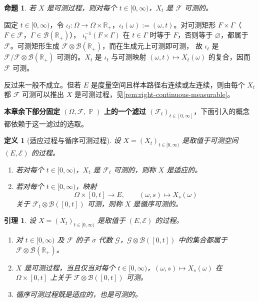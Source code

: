 \documentclass[UTF8,11pt,a4paper,oneside,fontset=fandol]{ctexrep}
\makeatletter
\numberwithin{equation}{section}
\theoremstyle{zhthm}
\newtheorem{proposition}[theorem]{命题}
\newtheorem{lemma}[theorem]{引理}
\newtheorem{definition}[theorem]{定义}
\renewenvironment{proof}[1][\proofname]{\par
  \pushQED{\qed}%
  \normalfont\topsep6\p@\@plus6\p@\relax
  \trivlist
  \item[\hskip\labelsep\bfseries#1\hspace{0.5em}]\ignorespaces
}{%
  \popQED\endtrivlist\@endpefalse
}
\renewcommand{\proofname}{证明}
\newcommand{\R}{\mathbb{R}}
\newcommand{\B}{\mathcal{B}}
\newcommand{\F}{\mathcal{F}}
\newcommand{\G}{\mathcal{G}}
\DeclareMathOperator{\Prob}{\mathbb{P}}
\makeatother
\begin{document}
\begin{proposition}
\label{prop:measurable-process-marginals}
若 $X$ 是可测过程，则对每个 $t\in[0,\infty)$，$X_t$ 是 $\F$ 可测的。
\end{proposition}

\begin{proof}
固定 $t\in[0,\infty)$，令 $\iota_t:\Omega\to\Omega\times\R_+$，$\iota_t(\omega):=(\omega,t)$。对可测矩形 $F\times\Gamma$（$F\in\F$，$\Gamma\in\B(\R_+)$），
$\iota_t^{-1}(F\times\Gamma)$ 在 $t\in\Gamma$ 时等于 $F$，否则等于 $\varnothing$，都属于 $\F$。可测矩形生成 $\F\otimes\B(\R_+)$，而在生成元上可测即可测\cite[定理 1.3.1]{Durrett2019}，
故 $\iota_t$ 是 $\F/\F\otimes\B(\R_+)$ 可测的。$X_t$ 是 $\iota_t$ 与可测映射 $(\omega,t)\mapsto X_t(\omega)$ 的复合，因而 $\F$ 可测。
\end{proof}

反过来一般不成立。但若 $E$ 是度量空间且样本路径右连续或左连续，则由每个 $X_t$ 都 $\F$ 可测可以推出 $X$ 是可测过程，见\cref{rem:right-continuous-measurable}。

\textbf{本章余下部分固定 $(\Omega,\F,\Prob)$ 上的一个滤过 $(\F_t)_{t\in[0,\infty]}$}，下面引入的概念都依赖于这一滤过的选取。

\begin{definition}[适应过程与循序可测过程]
\label{def:adapted-progressive}
设 $X=(X_t)_{t\in[0,\infty)}$ 是取值于可测空间 $(E,\mathcal E)$ 的过程。
\begin{enumerate}[label=(\arabic*)]
  \item 若对每个 $t\in[0,\infty)$，$X_t$ 是 $\F_t$ 可测的，则称 $X$ 是适应的。
  \item 若对每个 $t\in[0,\infty)$，映射
    \[
      \Omega\times[0,t]\to E,\qquad (\omega,s)\mapsto X_s(\omega)
    \]
    关于 $\F_t\otimes\B([0,t])$ 可测，则称 $X$ 是循序可测的。
\end{enumerate}
\end{definition}

\begin{lemma}
\label{lem:measurable-progressive-basic}
设 $X=(X_t)_{t\in[0,\infty)}$ 是取值于 $(E,\mathcal E)$ 的过程。
\begin{enumerate}[label=(\arabic*)]
  \item 对 $t\in[0,\infty)$ 及 $\F$ 的子 $\sigma$ 代数 $\G$，$\G\otimes\B([0,t])$ 中的集合都属于 $\F\otimes\B(\R_+)$。
  \item $X$ 是可测过程，当且仅当对每个 $t\in[0,\infty)$，$(\omega,s)\mapsto X_s(\omega)$ 在 $\Omega\times[0,t]$ 上关于 $\F\otimes\B([0,t])$ 可测。
  \item 循序可测过程既是适应的，也是可测的。
\end{enumerate}
\end{lemma}
\end{document}
